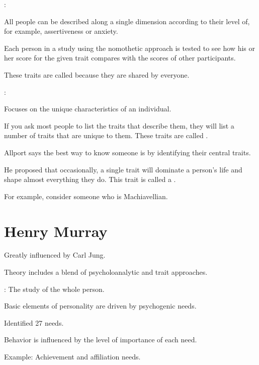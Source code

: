 \begin{coloredlist}
    \item {}:
    \begin{coloredlist}
        \item All people can be described along a single dimension according to their level of, for example, assertiveness or anxiety.
        \item Each person in a study using the nomothetic approach is tested to see how his or her score for the given trait compares with the scores of other participants.
        \item These traits are called  because they are shared by everyone.
    \end{coloredlist}
    \item {}:
    \begin{coloredlist}
        \item Focuses on the unique characteristics of an individual.
        \item If you ask most people to list the traits that describe them, they will list a number of traits that are unique to them. These traits are called .
    \end{coloredlist}
    \item Allport says the best way to know someone is by identifying their central traits.
    \item He proposed that occasionally, a single trait will dominate a person's life and shape almost everything they do. This trait is called a .
    \begin{coloredlist}
        \item For example, consider someone who is Machiavellian.
    \end{coloredlist}
\end{coloredlist}

\section{Henry Murray}

\begin{coloredlist}
    \item Greatly influenced by Carl Jung.
    \item Theory includes a blend of psycholoanalytic and trait approaches.
    \item {}: The study of the whole person.
    \begin{coloredlist}
        \item Basic elements of personality are driven by psychogenic needs.
        \item Identified 27 needs.
        \begin{coloredlist}
            \item Behavior is influenced by the level of importance of each need.
            \item Example: Achievement and affiliation needs.
        \end{coloredlist}
    \end{coloredlist}
\end{coloredlist}


